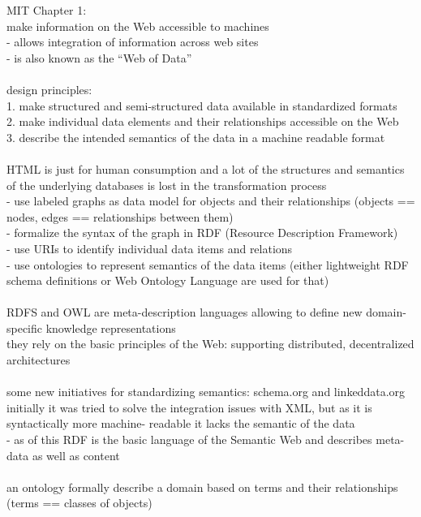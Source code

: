 MIT Chapter 1: \\
make information on the Web accessible to machines \\
- allows integration of information across web sites \\
- is also known as the ``Web of Data'' \\
\\
design principles: \\
1. make structured and semi-structured data available in standardized formats \\
2. make individual data elements and their relationships accessible on the Web \\
3. describe the intended semantics of the data in a machine readable format \\
\\
HTML is just for human consumption and a lot of the structures and semantics of the
underlying databases is lost in the transformation process \\
- use labeled graphs as data model for objects and their relationships (objects == nodes,
edges == relationships between them) \\
- formalize the syntax of the graph in RDF (Resource Description Framework) \\
- use URIs to identify individual data items and relations \\
- use ontologies to represent semantics of the data items (either lightweight RDF schema definitions
or Web Ontology Language are used for that) \\
\\
RDFS and OWL are meta-description languages allowing to define new domain-specific knowledge representations \\
they rely on the basic principles of the Web: supporting distributed, decentralized architectures \\
\\
some new initiatives for standardizing semantics: schema.org and linkeddata.org \\
initially it was tried to solve the integration issues with XML, but as it is syntactically more machine-
readable it lacks the semantic of the data \\
- as of this RDF is the basic language of the Semantic Web and describes meta-data as well as content \\
\\
an ontology formally describe a domain based on terms and their relationships (terms == classes of objects) \\
